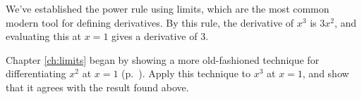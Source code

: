 We've established the power rule using limits, which are the most
common modern tool for defining derivatives. By this rule, the
derivative of $x^3$ is $3x^2$, and evaluating this at $x=1$ gives
a derivative of 3.

Chapter \ref{ch:limits} began by showing a more old-fashioned technique
for differentiating $x^2$ at $x=1$ (p.~\pageref{discard-dx-squared}). Apply this
technique to $x^3$ at $x=1$, and show that it agrees with the result found above.
